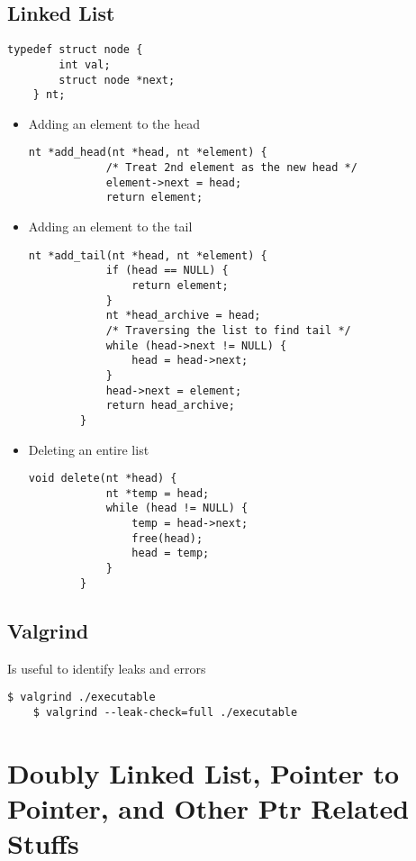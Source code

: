 \documentclass{article}
\begin{document}
\subsection{Linked List}
\begin{lstlisting}[style=CStyle]
    typedef struct node {
        int val;
        struct node *next;
    } nt;
\end{lstlisting}

\begin{itemize}
    \item Adding an element to the head
    \begin{lstlisting}[style=CStyle]
        nt *add_head(nt *head, nt *element) {
            /* Treat 2nd element as the new head */
            element->next = head;
            return element;
    \end{lstlisting}
    \item Adding an element to the tail
    \begin{lstlisting}[style=CStyle]
        nt *add_tail(nt *head, nt *element) {
            if (head == NULL) {
                return element;
            }
            nt *head_archive = head;
            /* Traversing the list to find tail */
            while (head->next != NULL) {
                head = head->next;
            }
            head->next = element;
            return head_archive;
        }
    \end{lstlisting}
    \item Deleting an entire list
    \begin{lstlisting}[style=CStyle]
        void delete(nt *head) {
            nt *temp = head;
            while (head != NULL) {
                temp = head->next;
                free(head);
                head = temp;
            }
        }
    \end{lstlisting}
\end{itemize}

\subsection{Valgrind}
Is useful to identify leaks and errors
\begin{lstlisting}[style=BashStyle]
    $ valgrind ./executable
    $ valgrind --leak-check=full ./executable
\end{lstlisting}

\section{Doubly Linked List, Pointer to Pointer, and Other Ptr Related Stuffs}
\end{document}
